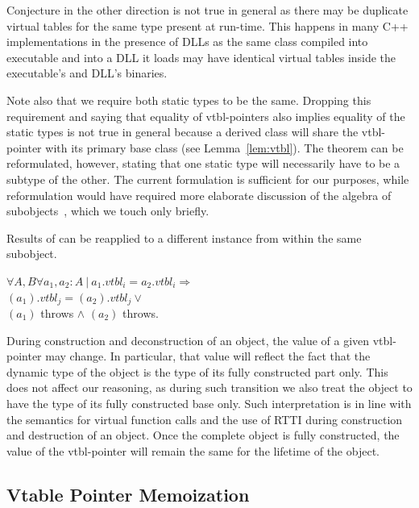 \noindent
Conjecture in the other direction is not true in general as there may be 
duplicate virtual tables for the same type present at run-time. This happens in 
many C++ implementations in the presence of DLLs as the same class compiled into 
executable and into a DLL it loads may have identical virtual tables inside the 
executable's and DLL's binaries.

Note also that we require both static types to be the same. Dropping this 
requirement and saying that equality of vtbl-pointers also implies equality of 
the static types is not true in general because a derived class will share the 
vtbl-pointer with its primary base class (see Lemma~\ref{lem:vtbl}). The theorem 
can be reformulated, however, stating that one static type will necessarily have 
to be a subtype of the other. The current formulation is sufficient for our 
purposes, while reformulation would have required more elaborate discussion of 
the algebra of subobjects~\cite{RDL11}, which we touch only briefly.

\begin{corollary}
Results of  can be reapplied to a different instance from 
within the same subobject. 

$\forall A,B \forall a_1, a_2 : A\ |\ a_1.\textit{vtbl}_i = a_2.\textit{vtbl}_i \Rightarrow$ \\
$(a_1).\textit{vtbl}_j = $$(a_2).\textit{vtbl}_j \vee$ \\
$(a_1)$ throws $\wedge$ $(a_2)$ throws.
\label{crl:vtbl}
\end{corollary}

\noindent
During construction and deconstruction of 
an object, the value of a given vtbl-pointer may change. In particular, 
that value will reflect the fact that the dynamic type of the object is the type of its 
fully constructed part only. This does not affect our reasoning, as during 
such transition we also treat the object to have the type of its fully 
constructed base only. Such interpretation is in line with the \Cpp{} semantics for 
virtual function calls and the use of RTTI during construction and destruction of an 
object. Once the complete object is fully constructed, the value of the 
vtbl-pointer will remain the same for the lifetime of the object.

\subsection{Vtable Pointer Memoization}
\label{sec:vtblmem}

